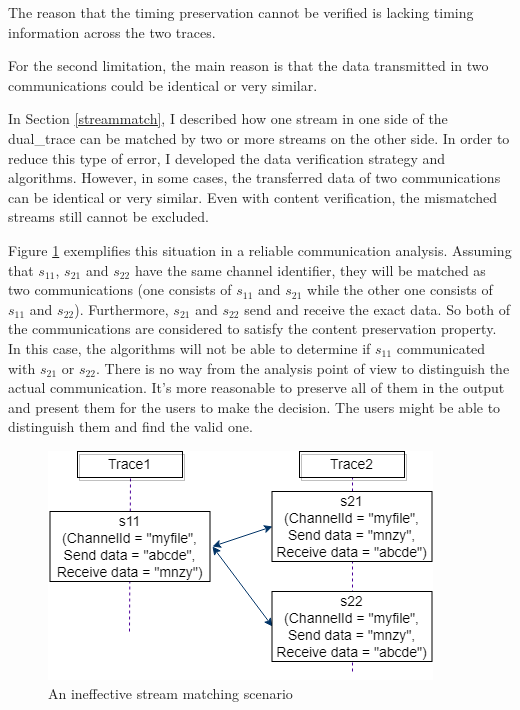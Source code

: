 \documentclass[12pt,oneside]{book}
\begin{document}
The reason that the timing preservation cannot be verified is lacking timing information across the two traces. 

For the second limitation, the main reason is that the data transmitted in two communications could be identical or very similar. 

In Section \ref{streammatch}, I described how one stream in one side of the dual\_trace can be matched by two or more streams on the other side. In order to reduce this type of error, I developed the data verification strategy and algorithms. However, in some cases, the transferred data of two communications can be identical or very similar. Even with content verification, the mismatched streams still cannot be excluded.

Figure \ref{secondlevelmatching} exemplifies this situation in a reliable communication analysis. Assuming that $s_{11}$, $s_{21}$ and $s_{22}$ have the same channel identifier, they will be matched as two communications (one consists of $s_{11}$ and $s_{21}$ while the other one consists of $s_{11}$ and $s_{22}$). Furthermore, $s_{21}$ and $s_{22}$ send and receive the exact data. So both of the communications are considered to satisfy the content preservation property. In this case, the algorithms will not be able to determine if  $s_{11}$ communicated with $s_{21}$ or $s_{22}$. There is no way from the analysis point of view to distinguish the actual communication. It's more reasonable to preserve all of them in the output and present them for the users to make the decision. The users might be able to distinguish them and find the valid one.


\begin{figure}[H]
\centerline{\includegraphics{Figures/secondlevelmatching}}
 \caption{An ineffective stream matching scenario}
\label{secondlevelmatching}
\end{figure}
\end{document}
